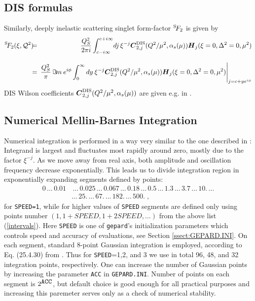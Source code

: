 \documentclass[12pt]{article}
\begin{document}
\subsection{DIS formulas}  
\label{ssect:DIS}

Similarly, deeply inelastic scattering singlet form-factor ${^{\rm S}\!{F_2}}$ is given by
\begin{eqnarray}
{^{\rm S}\!{F_2}}(\xi,{\cal Q}^2)
&\!\!\!=\!\!\!& \frac{Q_{S}^2}{2 \pi i}\int_{c-i \infty}^{c+ i \infty}\!
dj\,\xi^{-j}
\mbox{\boldmath $C$}^{\rm DIS}_{2,j}(Q^2/\mu^2,\alpha_s(\mu))
\mbox{\boldmath $H$}_{j} (\xi=0,\Delta^2=0,\mu^2) \nonumber \\[2ex]
&\!\!\!=\!\!\!& \frac{Q_{S}^2}{\pi}\, \Im\! m\: e^{i\phi}
\int_{0}^{\infty} dy\:  \xi^{-j}
\mbox{\boldmath $C$}^{\rm DIS}_{2,j}(Q^2/\mu^2,\alpha_s(\mu))
\mbox{\boldmath $H$}_{j} (\xi=0,\Delta^2=0,\mu^2) 
\Bigg|_{j = c + y e^{i\phi}}
\label{<F2formula>}
\end{eqnarray}
DIS Wilson coefficients $\mbox{\boldmath $C$}^{\rm DIS}_{2,j}(Q^2/\mu^2,\alpha_s(\mu))$
are given e.g. in \cite{vanNeerven:2000uj}.

\subsection{Numerical Mellin-Barnes Integration}  
\label{ssect:Integration}
Numerical integration is performed in a way very similar to the one described in
\cite{Vogt:2004ns}: Integrand is largest and
fluctuates most rapidly around zero, mostly due to the factor $\xi^{-j}$. As we
move away from real axis, both
amplitude and oscillation frequency decrease exponentially.
This leads us to divide integration region in exponentially expanding segments
defined by points:
\begin{align*}
0 \,\ldots\, 0.01 & \,\ldots\, 0.025 \,\ldots\, 0.067\,\ldots\, 0.18\,\ldots\, 0.5\,\ldots\, 1.3\,\ldots\, 3.7\,\ldots\, 10. \, \ldots \\
 & \ldots  \, 25. \, \ldots\, 67. \, \ldots\, 182. \, \ldots \, 500. \;,
\label{<intervals>}
\end{align*}
for \texttt{SPEED=1}, while for higher values of \texttt{SPEED} segments
are defined only using points number $(1, 1+SPEED, 1+ 2 SPEED, \ldots)$ from
the above list (\ref{intervals}).
Here \texttt{SPEED} is one of \texttt{gepard}'s initialization parameters which
controls speed and accuracy of evaluations, see Section \ref{ssect:GEPARD.INI}.
On each segment, standard 8-point Gaussian integration is employed, according
to Eq. (25.4.30) from \cite{AbS65}.
Thus for \texttt{SPEED}=1,2, and 3 we use in total 96, 48, and 32
integration points, respectively. 
One can increase the number of Gaussian points by increasing the parameter
\texttt{ACC} in \texttt{GEPARD.INI}. Number of points on each segment
is $2^{\mbox{\texttt{ACC}}}$,
but default choice is good enough for all practical purposes and increasing this
paremeter serves only as a check of numerical stability.
\end{document}
